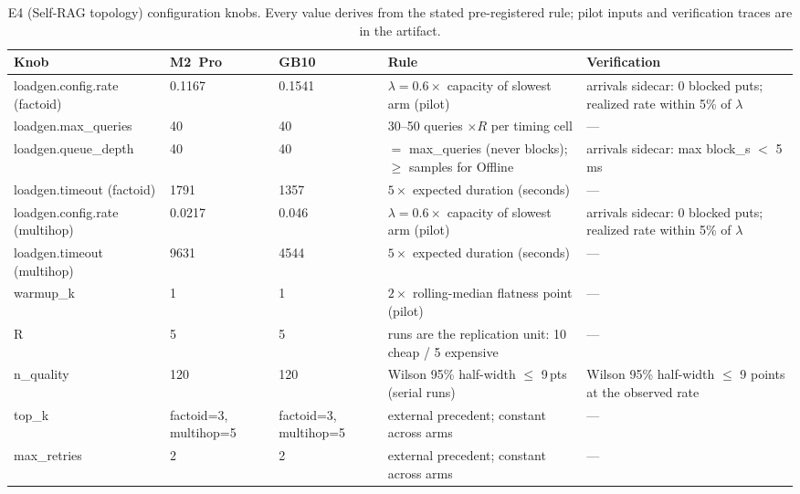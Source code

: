 \begin{table}[t]\centering\small
\caption{E4 (Self-RAG topology) configuration knobs. Every value derives from the stated pre-registered rule; pilot inputs and verification traces are in the artifact.}
\label{tab:knobs-e4}
\begin{tabular}{lllll}
\toprule
Knob & M2~Pro & GB10 & Rule & Verification \\
\midrule
loadgen.config.rate (factoid) & 0.1167 & 0.1541 & $\lambda = 0.6\times$ capacity of slowest arm (pilot) & arrivals sidecar: 0 blocked puts; realized rate within 5\% of $\lambda$ \\
loadgen.max\_queries & 40 & 40 & 30--50 queries $\times R$ per timing cell & --- \\
loadgen.queue\_depth & 40 & 40 & $=$ max\_queries (never blocks); $\geq$ samples for Offline & arrivals sidecar: max block\_s $<$ 5 ms \\
loadgen.timeout (factoid) & 1791 & 1357 & $5\times$ expected duration (seconds) & --- \\
loadgen.config.rate (multihop) & 0.0217 & 0.046 & $\lambda = 0.6\times$ capacity of slowest arm (pilot) & arrivals sidecar: 0 blocked puts; realized rate within 5\% of $\lambda$ \\
loadgen.timeout (multihop) & 9631 & 4544 & $5\times$ expected duration (seconds) & --- \\
warmup\_k & 1 & 1 & $2\times$ rolling-median flatness point (pilot) & --- \\
R & 5 & 5 & runs are the replication unit: 10 cheap / 5 expensive & --- \\
n\_quality & 120 & 120 & Wilson 95\% half-width $\leq$ 9\,pts (serial runs) & Wilson 95\% half-width $\leq$ 9 points at the observed rate \\
top\_k & factoid=3, multihop=5 & factoid=3, multihop=5 & external precedent; constant across arms & --- \\
max\_retries & 2 & 2 & external precedent; constant across arms & --- \\
\bottomrule
\end{tabular}
\end{table}

